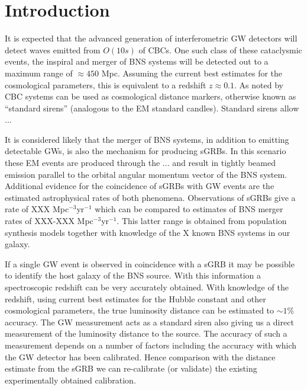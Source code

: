 \documentclass[10pt]{iopart}
\begin{document}
\section{Introduction\label{sec:intro}}

It is expected that the advanced generation of interferometric \ac{GW} detectors will detect waves 
emitted from $O(10s)$ of \acp{CBC}. One such class of these cataclysmic events, the inspiral and
merger of \ac{BNS} systems will be detected out to a maximum range of $\approx 450$ Mpc. Assuming 
the current best estimates for the cosmological parameters, this is equivalent to a redshift 
$z\approx 0.1$. As noted by \cite{1986Natur.323..310S} \ac{CBC} systems can be used as cosmological 
distance markers, otherwise known as ``standard sirens'' (analogous to the \ac{EM} standard 
candles). Standard sirens allow ...

It is considered likely that the merger of \ac{BNS} systems, in addition to emitting detectable 
\acp{GW}, is also the mechanism for producing \acp{sGRB}. In this scenario these \ac{EM} events are 
produced through the ... and result in tightly beamed emission parallel to the orbital angular 
momentum vector of the \ac{BNS} system. Additional evidence for the coincidence of \acp{sGRB} with
\ac{GW} events are the estimated astrophysical rates of both phenomena. Observations of \acp{sGRB} 
give a rate of XXX Mpc$^{-3}$yr$^{-1}$ which can be compared to estimates of \ac{BNS} merger rates 
of XXX-XXX Mpc$^{-3}$yr$^{-1}$. This latter range is obtained from population synthesis models 
together with knowledge of the X known \ac{BNS} systems in our galaxy. 
  
If a single \ac{GW} event is observed in coincidence with a \ac{sGRB} it may be possible to 
identify the host galaxy of the \ac{BNS} source.  With this information a spectroscopic redshift 
can be very accurately obtained. With knowledge of the redshift, using current best estimates for 
the Hubble constant and other cosmological parameters, the true luminosity distance can be
estimated to $\sim 1\%$ accuracy.  The \ac{GW} measurement acts as a standard siren also giving us 
a direct measurement of the luminosity distance to the source. The accuracy of such a measurement 
depends on a number of factors including the accuracy with which the \ac{GW} detector has been 
calibrated.  Hence comparison with the distance estimate from the \ac{sGRB} we can re-calibrate (or 
validate) the existing experimentally obtained calibration. 
\end{document}
